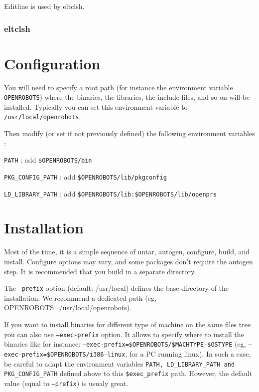Editline is used by eltclsh.

\subsubsection{eltclsh}


\section{Configuration}
\label{sec|configuration|configuration}


You will need to specify a root path (for instance the environment
variable \texttt{OPENROBOTS}) where the binaries, the libraries, the
include files, and so on will be installed. Typically you can set this
environment variable to \texttt{/usr/local/openrobots}.

Then modify (or set if not previously defined) the following 
environment variables :

\texttt{PATH} :  add \texttt{\$OPENROBOTS/bin}

\texttt{PKG\_CONFIG\_PATH} :  add  \texttt{\$OPENROBOTS/lib/pkgconfig}

\texttt{LD\_LIBRARY\_PATH} :  add  \texttt{\$OPENROBOTS/lib:\$OPENROBOTS/lib/openprs}



\section{Installation}
\label{sec|configuration|installation}

Most of the time, it is a simple sequence of untar, autogen, configure,
build, and install. Configure options may vary, and some packages don't
require the autogen step. It is recommended that you build in a separate
directory. 

The \texttt{--prefix} option (default: /usr/local) defines the base directory
of the installation. We recommend a dedicated path (eg,
OPENROBOTS=/usr/local/openrobots).

If you want to install binaries for different type of machine
on the same files tree you can also use \texttt{--exec-prefix}
option. It allows to specify where to install the binaries like for
instance: \texttt{--exec-prefix=\$OPENROBOTS/\$MACHTYPE-\$OSTYPE} (eg,
\texttt{--exec-prefix=\$OPENROBOTS/i386-linux}, for a PC running linux).
In such a case, be careful to adapt the environment variables 
\texttt{PATH, LD\_LIBRARY\_PATH and PKG\_CONFIG\_PATH} defined above to this
\texttt{\$exec\_prefix} path.
However, the default value (equal to \texttt{--prefix}) is usualy great. 


